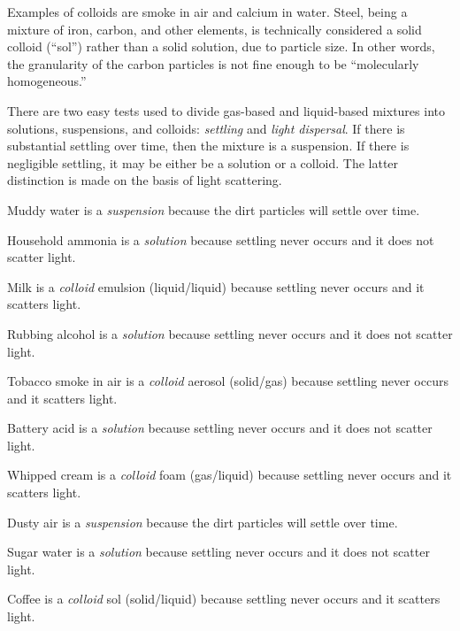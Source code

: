 Examples of colloids are smoke in air and calcium in water.  Steel, being a mixture of iron, carbon, and other elements, is technically considered a solid colloid (``sol'') rather than a solid solution, due to particle size.  In other words, the granularity of the carbon particles is not fine enough to be ``molecularly homogeneous.''

\vskip 10pt

There are two easy tests used to divide gas-based and liquid-based mixtures into solutions, suspensions, and colloids: {\it settling} and {\it light dispersal}.  If there is substantial settling over time, then the mixture is a suspension.  If there is negligible settling, it may be either be a solution or a colloid.  The latter distinction is made on the basis of light scattering.

\vskip 10pt

Muddy water is a {\it suspension} because the dirt particles will settle over time.

\vskip 10pt

Household ammonia is a {\it solution} because settling never occurs and it does not scatter light.

\vskip 10pt 

Milk is a {\it colloid} emulsion (liquid/liquid) because settling never occurs and it scatters light.

\vskip 10pt 

Rubbing alcohol is a {\it solution} because settling never occurs and it does not scatter light.

\vskip 10pt 

Tobacco smoke in air is a {\it colloid} aerosol (solid/gas) because settling never occurs and it scatters light.

\vskip 10pt 

Battery acid is a {\it solution} because settling never occurs and it does not scatter light.

\vskip 10pt 

Whipped cream is a {\it colloid} foam (gas/liquid) because settling never occurs and it scatters light.

\vskip 10pt 

Dusty air is a {\it suspension} because the dirt particles will settle over time.

\vskip 10pt 

Sugar water is a {\it solution} because settling never occurs and it does not scatter light.

\vskip 10pt 

Coffee is a {\it colloid} sol (solid/liquid) because settling never occurs and it scatters light.











